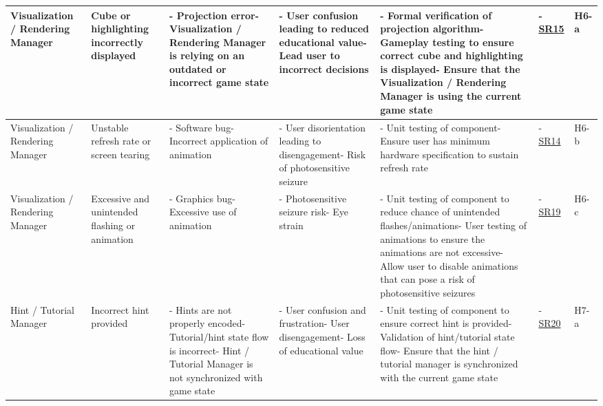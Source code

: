 \documentclass{article}
\begin{document}
\begin{landscape}
\begin{tabularx}{\linewidth}{|P{2.3cm}|Y|Y|Y|Y|P{1.7cm}|P{0.8cm}|}
    Visualization / Rendering Manager &
    Cube or highlighting incorrectly displayed &
    - Projection error\newline- Visualization / Rendering Manager is relying on an outdated or incorrect game state &
    - User confusion leading to reduced educational value\newline- Lead user to incorrect decisions &
    - Formal verification of projection algorithm\newline- Gameplay testing to ensure correct cube and highlighting is displayed\newline- Ensure that the Visualization / Rendering Manager is using the current game state &
    - \hyperref[req:SR15]{SR15} &
    H6-a \\

    \hline

    Visualization / Rendering Manager &
    Unstable refresh rate or screen tearing &
    - Software bug\newline- Incorrect application of animation &
    - User disorientation leading to disengagement\newline- Risk of photosensitive seizure &
    - Unit testing of component\newline- Ensure user has minimum hardware specification to sustain refresh rate &
    - \hyperref[req:SR14]{SR14} &
    H6-b \\

    \hline

    Visualization / Rendering Manager &
    Excessive and unintended flashing or animation &
    - Graphics bug\newline- Excessive use of animation &
    - Photosensitive seizure risk\newline- Eye strain &
    - Unit testing of component to reduce chance of unintended flashes/animations\newline- User testing of animations to ensure the animations are not excessive\newline- Allow user to disable animations that can pose a risk of photosensitive seizures &
    - \hyperref[req:SR19]{SR19} &
    H6-c \\

    \hline

    Hint / Tutorial Manager &
    Incorrect hint provided &
    - Hints are not properly encoded\newline- Tutorial/hint state flow is incorrect\newline- Hint / Tutorial Manager is not synchronized with game state &
    - User confusion and frustration\newline- User disengagement\newline- Loss of educational value &
    - Unit testing of component to ensure correct hint is provided\newline- Validation of hint/tutorial state flow\newline- Ensure that the hint / tutorial manager is synchronized with the current game state &
    - \hyperref[req:SR20]{SR20} &
    H7-a \\


\end{tabularx}
\end{landscape}
\end{document}
